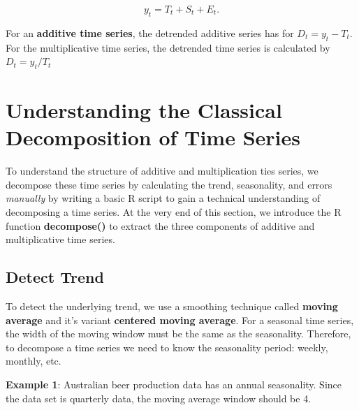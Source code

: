 \documentclass[
]{book}
\begin{document}
\[
y_t = T_t + S_t + E_t.
\]

For an \textbf{additive time series}, the detrended additive series has for \(D_t = y_t - T_t\). For the multiplicative time series, the detrended time series is calculated by \(D_t = y_t/T_t\)

\hypertarget{understanding-the-classical-decomposition-of-time-series}{%
\section{Understanding the Classical Decomposition of Time Series}\label{understanding-the-classical-decomposition-of-time-series}}

To understand the structure of additive and multiplication ties series, we decompose these time series by calculating the trend, seasonality, and errors \emph{manually} by writing a basic R script to gain a technical understanding of decomposing a time series. At the very end of this section, we introduce the R function \textbf{decompose()} to extract the three components of additive and multiplicative time series.

\hypertarget{detect-trend}{%
\subsection{Detect Trend}\label{detect-trend}}

To detect the underlying trend, we use a smoothing technique called \textbf{moving average} and it's variant \textbf{centered moving average}. For a seasonal time series, the width of the moving window must be the same as the seasonality. Therefore, to decompose a time series we need to know the seasonality period: weekly, monthly, etc.

\textbf{Example 1}: Australian beer production data has an annual seasonality. Since the data set is quarterly data, the moving average window should be 4.
\end{document}
